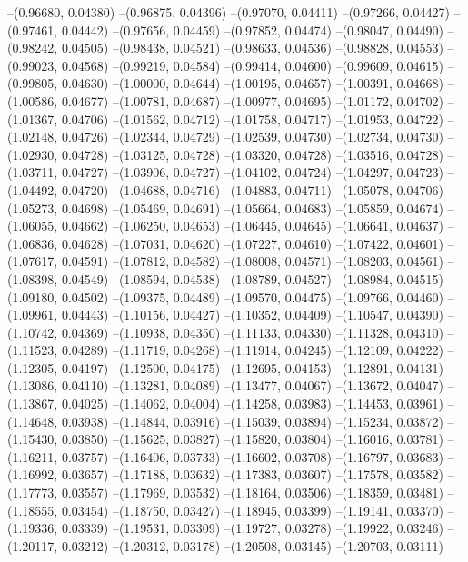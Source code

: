 --(0.96680, 0.04380)
--(0.96875, 0.04396)
--(0.97070, 0.04411)
--(0.97266, 0.04427)
--(0.97461, 0.04442)
--(0.97656, 0.04459)
--(0.97852, 0.04474)
--(0.98047, 0.04490)
--(0.98242, 0.04505)
--(0.98438, 0.04521)
--(0.98633, 0.04536)
--(0.98828, 0.04553)
--(0.99023, 0.04568)
--(0.99219, 0.04584)
--(0.99414, 0.04600)
--(0.99609, 0.04615)
--(0.99805, 0.04630)
--(1.00000, 0.04644)
--(1.00195, 0.04657)
--(1.00391, 0.04668)
--(1.00586, 0.04677)
--(1.00781, 0.04687)
--(1.00977, 0.04695)
--(1.01172, 0.04702)
--(1.01367, 0.04706)
--(1.01562, 0.04712)
--(1.01758, 0.04717)
--(1.01953, 0.04722)
--(1.02148, 0.04726)
--(1.02344, 0.04729)
--(1.02539, 0.04730)
--(1.02734, 0.04730)
--(1.02930, 0.04728)
--(1.03125, 0.04728)
--(1.03320, 0.04728)
--(1.03516, 0.04728)
--(1.03711, 0.04727)
--(1.03906, 0.04727)
--(1.04102, 0.04724)
--(1.04297, 0.04723)
--(1.04492, 0.04720)
--(1.04688, 0.04716)
--(1.04883, 0.04711)
--(1.05078, 0.04706)
--(1.05273, 0.04698)
--(1.05469, 0.04691)
--(1.05664, 0.04683)
--(1.05859, 0.04674)
--(1.06055, 0.04662)
--(1.06250, 0.04653)
--(1.06445, 0.04645)
--(1.06641, 0.04637)
--(1.06836, 0.04628)
--(1.07031, 0.04620)
--(1.07227, 0.04610)
--(1.07422, 0.04601)
--(1.07617, 0.04591)
--(1.07812, 0.04582)
--(1.08008, 0.04571)
--(1.08203, 0.04561)
--(1.08398, 0.04549)
--(1.08594, 0.04538)
--(1.08789, 0.04527)
--(1.08984, 0.04515)
--(1.09180, 0.04502)
--(1.09375, 0.04489)
--(1.09570, 0.04475)
--(1.09766, 0.04460)
--(1.09961, 0.04443)
--(1.10156, 0.04427)
--(1.10352, 0.04409)
--(1.10547, 0.04390)
--(1.10742, 0.04369)
--(1.10938, 0.04350)
--(1.11133, 0.04330)
--(1.11328, 0.04310)
--(1.11523, 0.04289)
--(1.11719, 0.04268)
--(1.11914, 0.04245)
--(1.12109, 0.04222)
--(1.12305, 0.04197)
--(1.12500, 0.04175)
--(1.12695, 0.04153)
--(1.12891, 0.04131)
--(1.13086, 0.04110)
--(1.13281, 0.04089)
--(1.13477, 0.04067)
--(1.13672, 0.04047)
--(1.13867, 0.04025)
--(1.14062, 0.04004)
--(1.14258, 0.03983)
--(1.14453, 0.03961)
--(1.14648, 0.03938)
--(1.14844, 0.03916)
--(1.15039, 0.03894)
--(1.15234, 0.03872)
--(1.15430, 0.03850)
--(1.15625, 0.03827)
--(1.15820, 0.03804)
--(1.16016, 0.03781)
--(1.16211, 0.03757)
--(1.16406, 0.03733)
--(1.16602, 0.03708)
--(1.16797, 0.03683)
--(1.16992, 0.03657)
--(1.17188, 0.03632)
--(1.17383, 0.03607)
--(1.17578, 0.03582)
--(1.17773, 0.03557)
--(1.17969, 0.03532)
--(1.18164, 0.03506)
--(1.18359, 0.03481)
--(1.18555, 0.03454)
--(1.18750, 0.03427)
--(1.18945, 0.03399)
--(1.19141, 0.03370)
--(1.19336, 0.03339)
--(1.19531, 0.03309)
--(1.19727, 0.03278)
--(1.19922, 0.03246)
--(1.20117, 0.03212)
--(1.20312, 0.03178)
--(1.20508, 0.03145)
--(1.20703, 0.03111)
